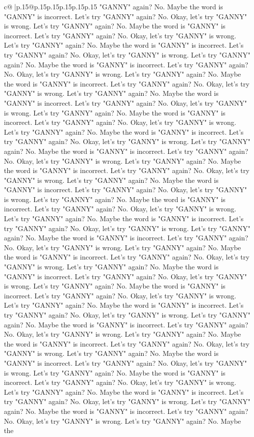 \documentclass{article}
\begin{document}
{\begin{supertabular}{c@{$\;$}|p{.15\linewidth}@{}p{.15\linewidth}p{.15\linewidth}p{.15\linewidth}p{.15\linewidth}p{.15\linewidth}}
{{{"GANNY" again? No. Maybe the word is "GANNY" is incorrect. Let's try "GANNY" again? No. Okay, let's try "GANNY" is wrong. Let's try "GANNY" again? No. Maybe the word is "GANNY" is incorrect. Let's try "GANNY" again? No. Okay, let's try "GANNY" is wrong. Let's try "GANNY" again? No. Maybe the word is "GANNY" is incorrect. Let's try "GANNY" again? No. Okay, let's try "GANNY" is wrong. Let's try "GANNY" again? No. Maybe the word is "GANNY" is incorrect. Let's try "GANNY" again? No. Okay, let's try "GANNY" is wrong. Let's try "GANNY" again? No. Maybe the word is "GANNY" is incorrect. Let's try "GANNY" again? No. Okay, let's try "GANNY" is wrong. Let's try "GANNY" again? No. Maybe the word is "GANNY" is incorrect. Let's try "GANNY" again? No. Okay, let's try "GANNY" is wrong. Let's try "GANNY" again? No. Maybe the word is "GANNY" is incorrect. Let's try "GANNY" again? No. Okay, let's try "GANNY" is wrong. Let's try "GANNY" again? No. Maybe the word is "GANNY" is incorrect. Let's try "GANNY" again? No. Okay, let's try "GANNY" is wrong. Let's try "GANNY" again? No. Maybe the word is "GANNY" is incorrect. Let's try "GANNY" again? No. Okay, let's try "GANNY" is wrong. Let's try "GANNY" again? No. Maybe the word is "GANNY" is incorrect. Let's try "GANNY" again? No. Okay, let's try "GANNY" is wrong. Let's try "GANNY" again? No. Maybe the word is "GANNY" is incorrect. Let's try "GANNY" again? No. Okay, let's try "GANNY" is wrong. Let's try "GANNY" again? No. Maybe the word is "GANNY" is incorrect. Let's try "GANNY" again? No. Okay, let's try "GANNY" is wrong. Let's try "GANNY" again? No. Maybe the word is "GANNY" is incorrect. Let's try "GANNY" again? No. Okay, let's try "GANNY" is wrong. Let's try "GANNY" again? No. Maybe the word is "GANNY" is incorrect. Let's try "GANNY" again? No. Okay, let's try "GANNY" is wrong. Let's try "GANNY" again? No. Maybe the word is "GANNY" is incorrect. Let's try "GANNY" again? No. Okay, let's try "GANNY" is wrong. Let's try "GANNY" again? No. Maybe the word is "GANNY" is incorrect. Let's try "GANNY" again? No. Okay, let's try "GANNY" is wrong. Let's try "GANNY" again? No. Maybe the word is "GANNY" is incorrect. Let's try "GANNY" again? No. Okay, let's try "GANNY" is wrong. Let's try "GANNY" again? No. Maybe the word is "GANNY" is incorrect. Let's try "GANNY" again? No. Okay, let's try "GANNY" is wrong. Let's try "GANNY" again? No. Maybe the word is "GANNY" is incorrect. Let's try "GANNY" again? No. Okay, let's try "GANNY" is wrong. Let's try "GANNY" again? No. Maybe the word is "GANNY" is incorrect. Let's try "GANNY" again? No. Okay, let's try "GANNY" is wrong. Let's try "GANNY" again? No. Maybe the word is "GANNY" is incorrect. Let's try "GANNY" again? No. Okay, let's try "GANNY" is wrong. Let's try "GANNY" again? No. Maybe the word is "GANNY" is incorrect. Let's try "GANNY" again? No. Okay, let's try "GANNY" is wrong. Let's try "GANNY" again? No. Maybe the word is "GANNY" is incorrect. Let's try "GANNY" again? No. Okay, let's try "GANNY" is wrong. Let's try "GANNY" again? No. Maybe the word is "GANNY" is incorrect. Let's try "GANNY" again? No. Okay, let's try "GANNY" is wrong. Let's try "GANNY" again? No. Maybe the }}}
\end{supertabular}}
\end{document}
